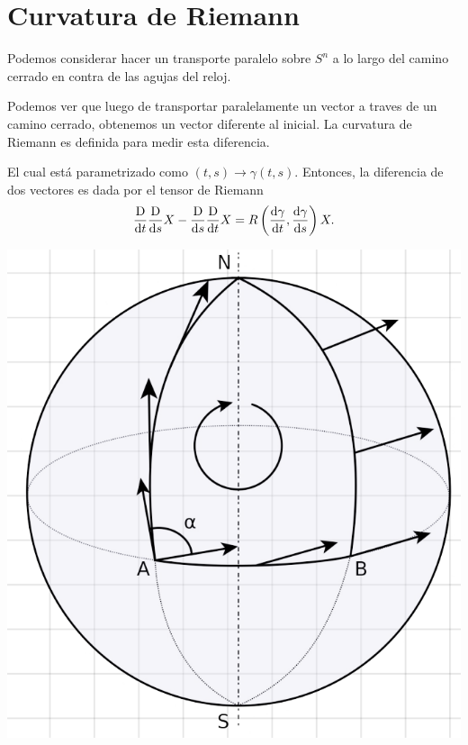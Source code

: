 \documentclass[../main]{subfiles}
\begin{document}
\section{Curvatura de Riemann}

\begin{minipage}{0.5\textwidth}
    Podemos considerar hacer un transporte paralelo sobre $S^n$ a lo largo del camino cerrado en contra de las agujas del reloj. 
    
    Podemos ver que luego de transportar paralelamente un vector a traves de un camino cerrado, obtenemos un vector diferente al inicial. La curvatura de Riemann es definida para medir esta diferencia. 

    El cual está parametrizado como $(t, s) \rightarrow \gamma(t, s)$. Entonces, la diferencia de dos vectores es dada por el tensor de Riemann 
    \begin{equation}
        \dfrac{\mathrm{D}}{\mathrm{d}t}\dfrac{\mathrm{D}}{\mathrm{d}s}X-\dfrac{\mathrm{D}}{\mathrm{d}s}\dfrac{\mathrm{D}}{\mathrm{d}t}X=R\left(\dv{\gamma}{t}, \dv{\gamma}{s}\right)X.
    \end{equation}
\end{minipage}
\begin{minipage}{0.5\textwidth}
    \begin{center}
        \includegraphics[scale=0.42]{img/imgRG4.4.PNG}
    \end{center}
\end{minipage}
\end{document}
